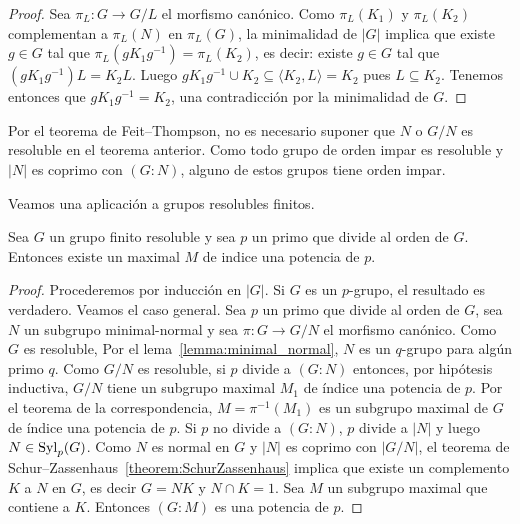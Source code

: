 \begin{proof}
	Sea $\pi_L\colon G\to G/L$ el morfismo canónico. Como
	$\pi_L(K_1)$ y $\pi_L(K_2)$ complementan a $\pi_L(N)$ en $\pi_L(G)$, la minimalidad
	de $|G|$ implica que existe $g\in G$ tal que $\pi_L(gK_1g^{-1})=\pi_L(K_2)$, es
	decir: existe $g\in G$ tal que $(gK_1g^{-1})L=K_2L$.  Luego $gK_1g^{-1}\cup
	K_2\subseteq \langle K_2,L\rangle=K_2$ pues $L\subseteq K_2$. Tenemos entonces que
	$gK_1g^{-1}=K_2$, una contradicción por la minimalidad de $G$. 
%
\end{proof}


	Por el teorema de Feit--Thompson, no es necesario suponer que $N$ o $G/N$
	es resoluble en el teorema anterior. Como
	todo grupo de orden impar es resoluble y $|N|$ es coprimo con $(G:N)$,
	alguno de estos grupos tiene orden impar.


Veamos una aplicación a grupos resolubles finitos.

\begin{theorem}
	\label{theorem:solvable_maximal}
	Sea $G$ un grupo finito resoluble y sea $p$ un primo que divide al orden de $G$.
	Entonces existe un maximal $M$ de indice una potencia de $p$.
\end{theorem}

\begin{proof}
	Procederemos por inducción en $|G|$. Si $G$ es un $p$-grupo, el resultado
	es verdadero. Veamos el caso general. Sea $p$ un primo que divide al orden
	de $G$, sea $N$ un subgrupo minimal-normal y sea $\pi\colon G\to G/N$ el
	morfismo canónico. Como $G$ es resoluble, Por el lema~\ref{lemma:minimal_normal}, $N$ es un
	$q$-grupo para algún primo $q$. Como $G/N$ es resoluble, si $p$ divide a
	$(G:N)$ entonces, por hipótesis inductiva, $G/N$ tiene un subgrupo maximal
	$M_1$ de índice una potencia de $p$. Por el teorema de la correspondencia,
	$M=\pi^{-1}(M_1)$ es un subgrupo maximal de $G$ de índice una potencia de
	$p$. Si $p$ no divide a $(G:N)$, $p$ divide a $|N|$ y luego
	$N\in\mathrm{Syl}_p(G)$. Como $N$ es normal en $G$ y $|N|$ es coprimo con $|G/N|$,
	el teorema de Schur--Zassenhaus~\ref{theorem:SchurZassenhaus} implica que
	existe un complemento $K$ a $N$ en $G$, es decir $G=NK$ y $N\cap K=1$. Sea
	$M$ un subgrupo maximal que contiene a $K$. Entonces $(G:M)$ es una
	potencia de $p$.
\end{proof}

